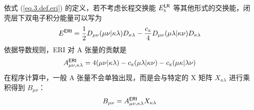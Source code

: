 依式 (\ref{eq.3.def.eri}) 的定义，若不考虑长程交换能 $E_\mathrm{x}^{\textsf{LR}}$ 等其他形式的交换能，闭壳层下双电子积分能量可以写为
\begin{equation*}
    E^{\textsf{ERI}} = \frac{1}{2} D_{\mu \nu} (\mu \nu | \kappa \lambda) D_{\kappa \lambda} - \frac{c_\mathrm{x}}{4} D_{\mu \nu} (\mu \lambda | \kappa \nu) D_{\kappa \lambda}
\end{equation*}
依据导数规则，ERI 对 A 张量的贡献是
\begin{equation}
    \label{eq.3.deduct.A-eri-expand}
    A_{\mu \nu, \kappa \lambda}^{\textsf{ERI}} = 4 (\mu \nu | \kappa \lambda) - c_\mathrm{x} (\mu \lambda | \kappa \nu) - c_\mathrm{x} (\mu \kappa | \lambda \nu)
\end{equation}
在程序计算中，一般 A 张量不会单独出现，而是会与特定的 X 矩阵 $X_{\kappa \lambda}$ 进行乘积得到 $B_{\mu \nu}$：
\begin{equation}
    \label{eq.3.ax-to-b-eri}
    B_{\mu \nu} = A_{\mu \nu, \kappa \lambda}^{\textsf{ERI}} X_{\kappa \lambda}
\end{equation}

